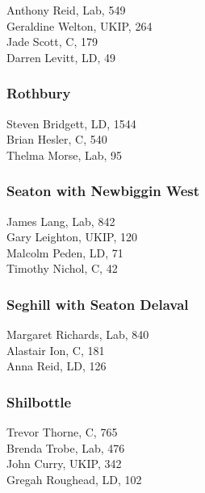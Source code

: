 \documentclass[a4paper,openany,10pt]{book}
\begin{document}
Anthony Reid, Lab, 549\\
Geraldine Welton, UKIP, 264\\
Jade Scott, C, 179\\
Darren Levitt, LD, 49\\


\subsubsection*{Rothbury}



Steven Bridgett, LD, 1544\\
Brian Hesler, C, 540\\
Thelma Morse, Lab, 95\\


\subsubsection*{Seaton with Newbiggin West}



James Lang, Lab, 842\\
Gary Leighton, UKIP, 120\\
Malcolm Peden, LD, 71\\
Timothy Nichol, C, 42\\


\subsubsection*{Seghill with Seaton Delaval}



Margaret Richards, Lab, 840\\
Alastair Ion, C, 181\\
Anna Reid, LD, 126\\


\subsubsection*{Shilbottle}



Trevor Thorne, C, 765\\
Brenda Trobe, Lab, 476\\
John Curry, UKIP, 342\\
Gregah Roughead, LD, 102\\
\end{document}
